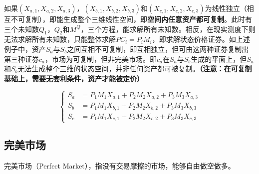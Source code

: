 \documentclass[11pt]{article}
\begin{document}
如果$(X_{a,1},X_{a,2},X_{a,3})$，$(X_{b,1},X_{b,2},X_{b,3})$和$(X_{c,1},X_{c,2},X_{c,3})$为线性独立（相互不可复制），即能生成整个三维线性空间，即\textbf{空间内任意资产都可复制}。此时有三个未知数$Q_1$，$Q_2$和$M^Q$，三个方程，能求解所有未知数。相反，在现实测度下则无法求解所有未知数，只能整体求解$PC_i = P_iM_i$，即求解状态价格证券。如上述例子中，资产$S_a$与$S_b$之间互相不可复制，即互相独立，但可由这两种证券复制出第三种证券$c_a$，市场为可复制，但非完美市场。即$c_a$在$S_a$与$S_b$生成的平面上，但$S_a$和$S_b$无法生成整个三维的状态空间，并非任何资产都可被复制。\textbf{（注意：在可复制基础上，需要无套利条件，资产才能被定价）}

\begin{equation*}
  \left\{
    \begin{aligned}
      S_a &= P_1M_1X_{a,1} + P_2M_2X_{a,2} + P_3M_3X_{a,3} \\
      S_b &= P_1M_1X_{b,1} + P_2M_2X_{b,2} + P_3M_3X_{b,3} \\
      S_c &= P_1M_1X_{c,1} + P_2M_2X_{c,2} + P_3M_3X_{c,3}
    \end{aligned}
  \right.
\end{equation*}

\subsection*{完美市场}
完美市场（Perfect Market），指没有交易摩擦的市场，能够自由做空做多。
\end{document}
